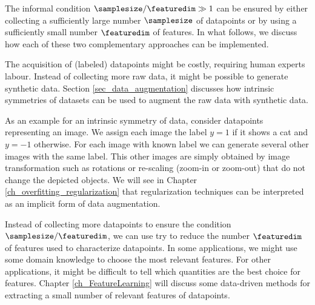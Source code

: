 \documentclass[12pt]{report}
\newcommand{\featurelen}{\featuredim}
\begin{document}
The informal condition $\samplesize/\featurelen \gg 1$ can be ensured 
by either collecting a sufficiently large number $\samplesize$ of datapoints 
or by using a sufficiently small number $\featurelen$ of features. In what 
follows, we discuss how each of these two complementary approaches 
can be implemented. 

The acquisition of (labeled) datapoints might be costly, requiring human 
experts labour. Instead of collecting more raw data, it might 
be possible to generate synthetic data. Section \ref{sec_data_augmentation} 
discusses how intrinsic symmetries of datasets can be used to augment 
the raw data with synthetic data. 

As an example for an intrinsic symmetry of data, consider datapoints 
representing an image. We assign each image the label $y=1$ if it shows 
a cat and $y=-1$ otherwise. For each image with known label we can 
generate several other images with the same label. This other images 
are simply obtained by image transformation such as rotations or 
re-scaling (zoom-in or zoom-out) that do not change the depicted 
objects. We will see in Chapter \ref{ch_overfitting_regularization} 
that regularization techniques can be interpreted as an implicit 
form of data augmentation.  

Instead of collecting more datapoints to ensure the condition $\samplesize/\featurelen$, 
we can use try to reduce the number $\featurelen$ of features used to 
characterize datapoints. In some applications, we might use some domain 
knowledge to choose the most relevant features. For other applications, 
it might be difficult to tell which quantities are the best choice for features. 
Chapter \ref{ch_FeatureLearning} will discuss some data-driven methods 
for extracting a small number of relevant features of datapoints. 

\end{document}
